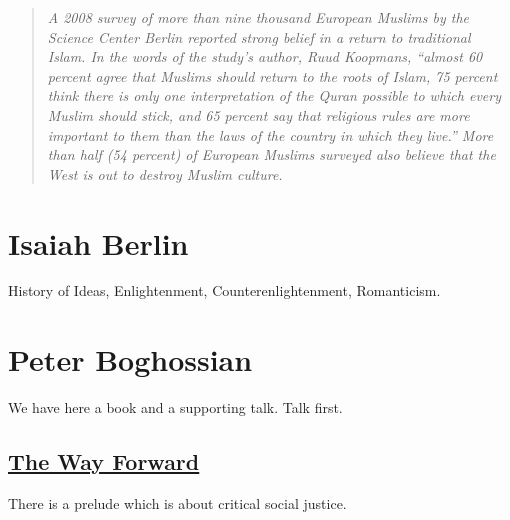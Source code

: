 \documentclass[10pt,titlepage]{book}
\begin{document}
\begin{quote}
{\it
A 2008 survey of more than nine thousand European Muslims
by the Science Center Berlin reported strong belief in a return
to traditional Islam. In the words of the study’s author, Ruud
Koopmans, “almost 60 percent agree that Muslims should return
to the roots of Islam, 75 percent think there is only one interpretation of the Quran possible to which every Muslim should stick,
and 65 percent say that religious rules are more important to
them than the laws of the country in which they live.” More than
half (54 percent) of European Muslims surveyed also believe
that the West is out to destroy Muslim culture.
}
\end{quote}

\section{Isaiah Berlin}\label{BerlinIsaiah}

History of Ideas, Enlightenment, Counterenlightenment, Romanticism.

\section{Peter Boghossian}\label{BoghossianPeter}

We have here a book and a supporting talk.
Talk first.

\subsection{\href{https://www.youtube.com/watch?v=LiymUd9FjHA}{The Way Forward}}

There is a prelude which is about critical social justice.
\end{document}
